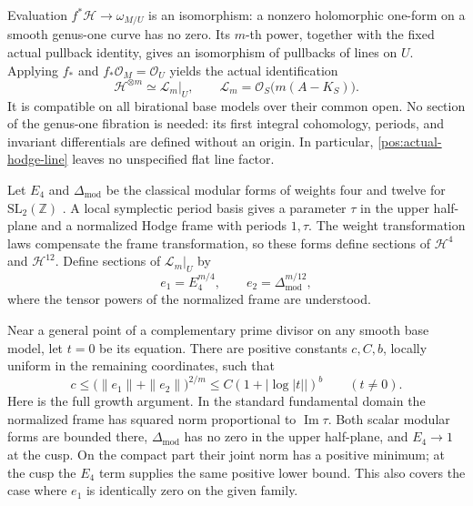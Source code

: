 \documentclass[11pt,letterpaper]{article}
\theoremstyle{definition}
\theoremstyle{remark}
\begin{document}
Evaluation \(f^*\mathcal H\to\omega_{M/U}\) is an isomorphism:
a nonzero holomorphic one-form on a smooth genus-one curve has no zero.
Its \(m\)-th power, together with the fixed actual pullback identity,
gives an isomorphism of pullbacks of lines on \(U\). Applying
\(f_*\) and \(f_*\mathcal{O}_M=\mathcal{O}_U\) yields the actual identification
\begin{equation}\label{pos:actual-hodge-line}
 \mathcal H^{\otimes m}\simeq\mathcal L_m|_U,
 \qquad\mathcal L_m=\mathcal{O}_S\bigl(m(A-K_S)\bigr).
\end{equation}
It is compatible on all birational base models over their common
open. No section of the genus-one fibration is needed: its first
integral cohomology, periods, and invariant differentials are defined
without an origin. In particular, \eqref{pos:actual-hodge-line}
leaves no unspecified flat line factor.

Let \(E_4\) and \(\Delta_{\mathrm{mod}}\) be the classical modular
forms of weights four and twelve for \(\mathrm{SL}_2(\mathbb{Z})\)
\cite[Chapter~VII]{SerreArithmetic}. A local symplectic period basis
gives a parameter \(\tau\) in the upper half-plane and a normalized
Hodge frame with periods \(1,\tau\). The weight transformation laws
compensate the frame transformation, so these forms define sections
of \(\mathcal H^4\) and \(\mathcal H^{12}\). Define sections of
\(\mathcal L_m|_U\) by
\begin{equation}\label{pos:modular-sections}
 e_1=E_4^{m/4},\qquad e_2=\Delta_{\mathrm{mod}}^{m/12},
\end{equation}
where the tensor powers of the normalized frame are understood.

Near a general point of a complementary prime divisor on any smooth
base model, let \(t=0\) be its equation. There are positive constants
\(c,C,b\), locally uniform in the remaining coordinates, such that
\begin{equation}\label{pos:modular-growth}
 c\leq\bigl(\|e_1\|+\|e_2\|\bigr)^{2/m}
 \leq C(1+|\log|t||)^b\qquad(t\ne0).
\end{equation}
Here is the full growth argument. In the standard fundamental domain
the normalized frame has squared norm proportional to
\(\operatorname{Im}\tau\). Both scalar modular forms are bounded
there, \(\Delta_{\mathrm{mod}}\) has no zero in the upper half-plane,
and \(E_4\to1\) at the cusp. On the compact part their joint norm has
a positive minimum; at the cusp the \(E_4\) term supplies the same
positive lower bound. This also covers the case where \(e_1\) is
identically zero on the given family.
\end{document}
